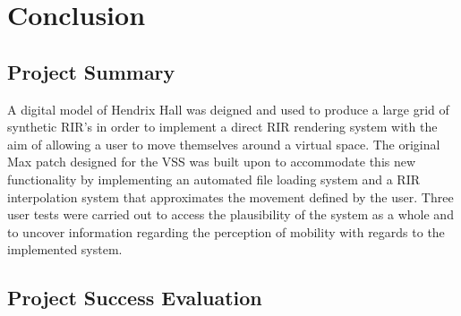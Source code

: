 \documentclass[../../main.tex]{subfiles}
\begin{document}
	\section{Conclusion}
	
		\subsection{Project Summary}
		A digital model of Hendrix Hall was deigned and used to produce a large grid of synthetic \ac{RIR}'s in order to implement a direct \ac{RIR} rendering system with the aim of allowing a user to move themselves around a virtual space. The original Max patch designed for the \ac{VSS} was built upon to accommodate this new functionality by implementing an automated file loading system and a \ac{RIR} interpolation system that approximates the movement defined by the user. Three user tests were carried out to access the plausibility of the system as a whole and to uncover information regarding the perception of mobility with regards to the implemented system. 







		\subsection{Project Success Evaluation}
\end{document}

